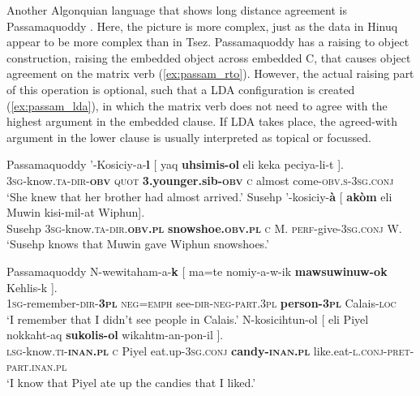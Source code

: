 \documentclass[output=paper
,modfonts
,nonflat]{langsci/langscibook}
\begin{document}
Another Algonquian language that shows long distance agreement is Passamaquoddy \citep{Bruening2001a}. Here, the picture is more complex, just as the data in Hinuq appear to be more complex than in Tsez. Passamaquoddy has a raising to object construction, raising the embedded object across embedded C, that causes object agreement on the matrix verb (\ref{ex:passam_rto}). However, the actual raising part of this operation is optional, such that a LDA configuration is created (\ref{ex:passam_lda}), in which the matrix verb does not need to agree with the highest argument in the embedded clause. If LDA takes place, the agreed-with argument in the lower clause is usually interpreted as topical or focussed.\largerpage[-3]\pagebreak
\begin{exe}
\ex Passamaquoddy \citep[][258]{Bruening2001a}\label{ex:passam_rto}
	\xlist
	\ex	
		\gll '-Kosiciy-a-\textbf{l} [ yaq \textbf{uhsimis-ol} eli keka peciya-li-t ].\\
			 \textsc{3sg}-know.\textsc{ta-dir-\textbf{obv}} {} \textsc{quot} \textbf{3.younger.sib-\textsc{obv}} \textsc{c} almost come-\textsc{obv.s-3sg.conj}\\
		\glt `She knew that her brother had almost arrived.'
	\ex 
		\gll Susehp '-kosiciy-\textbf{\`{a}} [ \textbf{ak\`{o}m} eli Muwin kisi-mil-at Wiphun].\\
			 Susehp \textsc{3sg}-know.\textsc{ta-dir.\textbf{obv.pl}} {} \textbf{snowshoe.\textsc{obv.pl}} \textsc{c} M. \textsc{perf}-give-\textsc{3sg.conj} W.\\
		\glt `Susehp knows that Muwin gave Wiphun snowshoes.'
	\endxlist
\end{exe}
\begin{exe}
\ex Passamaquoddy \citep[][259]{Bruening2001a}\label{ex:passam_lda}
	\xlist
	\ex	\label{ex:passam_ti_lda}
		\gll N-wewitaham-a-\textbf{k} [ ma=te nomiy-a-w-ik \textbf{mawsuwinuw-ok} Kehlis-k ].\\
			 \textsc{1sg}-remember-\textsc{dir-\textbf{3pl}} {} \textsc{neg=emph} see-\textsc{dir-neg-part.3pl} \textbf{person-\textsc{3pl}} Calais-\textsc{loc} {}\\
		\glt `I remember that I didn't see people in Calais.'
	\ex
		\gll N-kosicihtun-ol [ eli Piyel nokkaht-aq \textbf{sukolis-ol} wikahtm-an-pon-il ].\\
			 \textsc{lsg}-know.\textsc{ti-\textbf{inan.pl}} {} \textsc{c} Piyel eat.up-\textsc{3sg.conj} \textbf{candy-\textsc{inan.pl}} like.eat-\textsc{l.conj-pret-part.inan.pl}\\
		\glt `I know that Piyel ate up the candies that I liked.'
	\endxlist
\end{exe}
\end{document}
